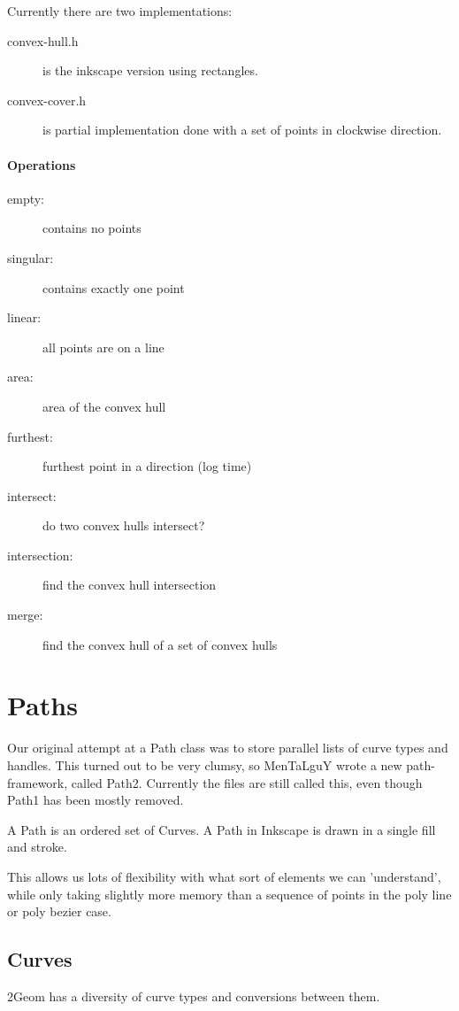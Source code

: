 \documentclass[openany]{book}
\newcommand{\code}[1]{\textsf{#1}}
\begin{document}
Currently there are two implementations:
\begin{description}
\item[convex-hull.h] is the inkscape version using rectangles.
\item[convex-cover.h] is partial implementation done with a set of points in clockwise direction.
\end{description}

\subsubsection{Operations}
\begin{description}
\item[empty:] contains no points
\item[singular:] contains exactly one point
\item[linear:] all points are on a line
\item[area:] area of the convex hull
\item[furthest:] furthest point in a direction (log time)
\item[intersect:] do two convex hulls intersect?
\item[intersection:] find the convex hull intersection
\item[merge:] find the convex hull of a set of convex hulls
\end{description}

\chapter{Paths}

Our original attempt at a \code{Path} class was to store parallel
lists of curve types and handles.  This turned out to be very clumsy,
so MenTaLguY wrote a new path-framework, called Path2.  Currently the
files are still called this, even though Path1 has been mostly
removed.

A \code{Path} is an ordered set of \code{Curve}s.  A \code{Path} in
Inkscape is drawn in a single fill and stroke.

This allows us lots of flexibility with what sort of elements we can
'understand', while only taking slightly more memory than a sequence
of points in the poly line or poly bezier case. 

\section{Curves}
2Geom has a diversity of curve types and conversions between them.
\end{document}
